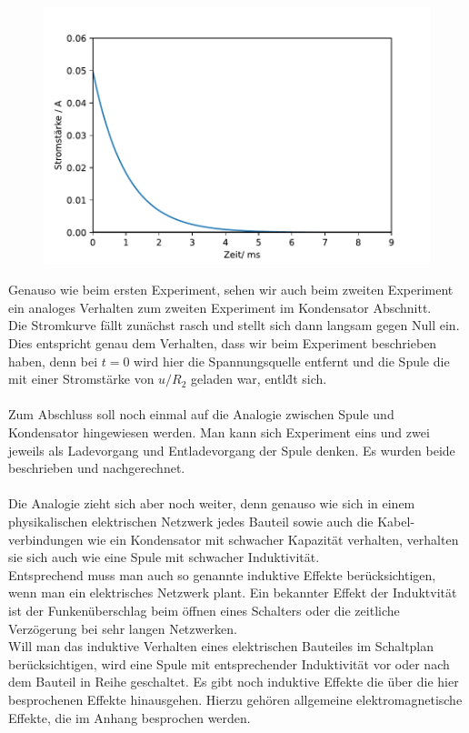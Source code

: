 \documentclass[11pt,a4paper,leqno]{report}
\numberwithin{equation}{chapter}
\begin{document}
  \begin{figure}[H]
	\begin{center}
		\includegraphics[scale=0.75]{entladungsspule.pdf}
	\end{center}
\end{figure}
\noindent
Genauso wie beim ersten Experiment, sehen wir auch beim zweiten Experiment ein analoges Verhalten zum zweiten Experiment im Kondensator Abschnitt.\\
Die Stromkurve f\"allt zun\"achst rasch und stellt sich dann langsam gegen Null ein. Dies entspricht genau dem Verhalten, dass wir beim Experiment beschrieben haben, denn bei $t=0$ wird hier die Spannungsquelle entfernt und die Spule die mit einer Stromst\"arke von $u/R_2$ geladen war, entl\"dt sich.\\
\\
Zum Abschluss soll noch einmal auf die Analogie zwischen Spule und Kondensator hingewiesen werden. Man kann sich Experiment eins und zwei jeweils als Ladevorgang und Entladevorgang der Spule denken. Es wurden beide beschrieben und nachgerechnet.\\
\\
Die Analogie zieht sich aber noch weiter, denn genauso wie sich in einem physikalischen elektrischen Netzwerk jedes Bauteil sowie auch die Kabel- verbindungen wie ein Kondensator mit schwacher Kapazit\"at verhalten, verhalten sie sich auch wie eine Spule mit schwacher Induktivit\"at.\\
Entsprechend muss man auch so genannte induktive Effekte ber\"ucksichtigen, wenn man ein elektrisches Netzwerk plant. Ein bekannter Effekt der Induktvit\"at ist der Funken\"uberschlag beim \"offnen eines Schalters oder die zeitliche Verz\"ogerung bei sehr langen Netzwerken.\\
Will man das induktive Verhalten eines elektrischen Bauteiles im Schaltplan ber\"ucksichtigen, wird eine Spule mit entsprechender Induktivit\"at vor oder nach dem Bauteil in Reihe geschaltet. Es gibt noch induktive Effekte die \"uber die hier besprochenen Effekte hinausgehen. Hierzu geh\"oren allgemeine elektromagnetische Effekte, die im Anhang besprochen werden.
\end{document}
